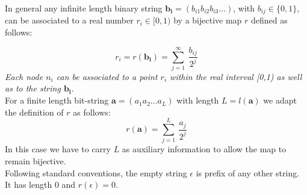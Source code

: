 \documentclass[12pt,a4paper]{report}
\begin{document}
In general any infinite length binary string $\mathbf{b_{i}}=(b_{i1}b_{i2}b_{i3}\ldots)$, with $b_{ij} \in \{0,1\}$, can be associated to a real number $r_{i} \in [0,1)$ by a bijective map $r$ defined as follows:

\begin{equation}
r_{i}=r(\mathbf{b_{i}})=\sum_{j=1}^{\infty} \ \frac{b_{ij}}{2^{j}}
\end{equation}
\emph{Each node $n_{i}$ can be associated to a point $r_{i}$ within the real interval [0,1) as well as to the string $\mathbf{b_{i}}$}.\\
For a finite length bit-string $\mathbf{a}=(a_{1}a_{2}\ldots a_{L})$ with length $L=l(\mathbf{a})$ we adapt the definition of $r$ as follows:
\begin{equation}
r(\mathbf{a})=\sum_{j=1}^{L} \ \frac{a_{j}}{2^{j}}
\end{equation}
In this case we have to carry $L$ as auxiliary information to allow the map to remain bijective.\\
Following standard conventions, the empty string $\epsilon$ is prefix of any other string. It has length 0 and $r(\epsilon)=0$.

\end{document}
